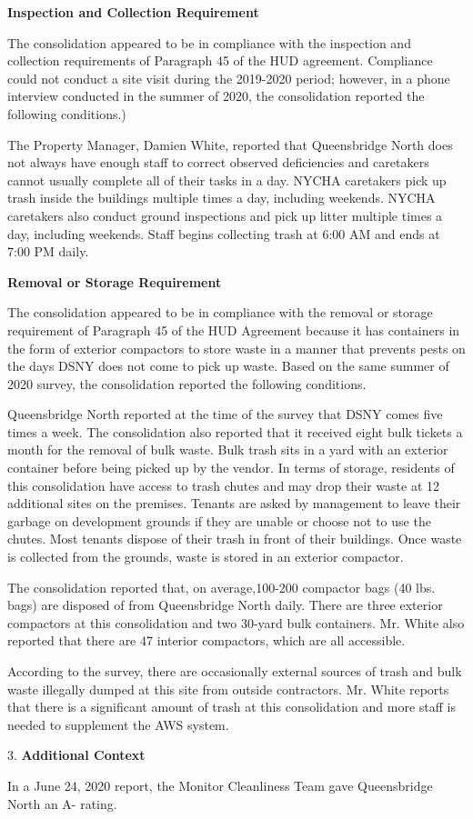 

\textbf{Inspection and Collection Requirement}

The consolidation appeared to be in compliance with the inspection and collection requirements of Paragraph 45 of the HUD agreement. Compliance could not conduct a site visit during the 2019-2020 period; however, in a phone interview conducted in the summer of 2020, the consolidation reported the following conditions.)

The Property Manager, Damien White, reported that Queensbridge North does not always have enough staff to correct observed deficiencies and caretakers cannot usually complete all of their tasks in a day. NYCHA caretakers pick up trash inside the buildings multiple times a day, including weekends. NYCHA caretakers also conduct ground inspections and pick up litter multiple times a day, including weekends. Staff begins collecting trash at 6:00 AM and ends at 7:00 PM daily. 

\textbf{Removal or Storage Requirement}

The consolidation appeared to be in compliance with the  removal or storage requirement of Paragraph  45 of the HUD Agreement because it has containers in the form of exterior compactors to store waste in a manner that prevents pests on the days DSNY does not come to pick up waste. Based on the same summer of  2020 survey, the consolidation reported the following conditions.

Queensbridge North reported at the time of the survey that DSNY comes five times a week. The consolidation also reported that it received eight bulk tickets a month for the removal of bulk waste.  Bulk trash sits in a yard with an exterior container before being picked up by the vendor. In terms of storage, residents of this consolidation have access to trash chutes and may drop their waste at 12 additional sites on the premises. Tenants are asked by management to leave their garbage on development grounds if they are unable or choose not to use the chutes. Most tenants dispose of their trash in front of their buildings. Once waste is collected from the grounds, waste is stored in an exterior compactor. 

The consolidation reported that, on average,100-200 compactor bags (40 lbs. bags) are disposed of from Queensbridge North daily. There are three exterior compactors at this consolidation and two 30-yard bulk containers. Mr. White also reported that there are 47 interior compactors, which are all accessible.

According to the survey, there are occasionally external sources of trash and bulk waste illegally dumped at this site from outside contractors. Mr. White reports that there is a significant amount of trash at this consolidation and more staff is needed to supplement the AWS system.

3. \textbf{Additional Context} 

In a June 24, 2020 report, the Monitor Cleanliness Team gave Queensbridge North an A- rating. 